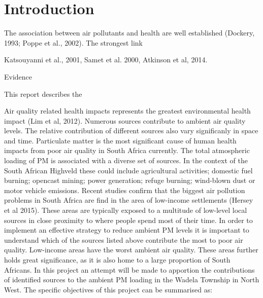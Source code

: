 \documentclass{nwureport}
\begin{document}
\clearpage

\dominitoc
\setcounter{tocdepth}{2} %
\pagestyle{plain}
{\thispagestyle{plain}
\tableofcontents
\clearpage
\listoffigures
{}
\clearpage
\listoftables
{}
\printglossaries
}

\pagestyle{mainmatter}


\chapter{Introduction}

The association between air pollutants and health are well established (Dockery, 1993; Poppe et al., 2002). The strongest link

Katsouyanni et al., 2001, Samet et al. 2000, Atkinson et al, 2014.

Evidence 

This report describes the 

Air quality related health impacts represents the greatest environmental health impact (Lim et al, 2012).
Numerous sources contribute to ambient air quality levels. The relative contribution of different sources also
vary significanly in space and time. Particulate matter is the most significant cause of human health impacts
from poor air quality in South Africa currently. The total atmospheric loading of PM is associated with a
diverse set of sources. In the context of the South African Highveld these could include agricultural activities;
domestic fuel burning; opencast mining; power generation; refuge burning; wind-blown dust or motor vehicle
emissions. Recent studies confirm that the biggest air pollution problems in South Africa are find in the area
of low-income settlements (Hersey et al 2015). These areas are typically exposed to a multitude of low-level
local sources in close proximity to where people spend most of their time. In order to implement an effective
strategy to reduce ambient PM levels it is important to understand which of the sources listed above
contribute the most to poor air quality. Low-income areas have the worst ambient air quality. These areas
further holds great significance, as it is also home to a large proportion of South Africans. In this project an
attempt will be made to apportion the contributions of identified sources to the ambient PM loading in the
Wadela Township in North West. The specific objectives of this project can be summarised as:
\end{document}

